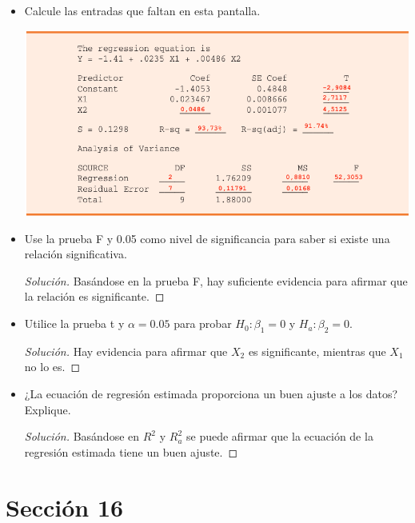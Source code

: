 \documentclass[a4paper,12pt]{article}
\newenvironment{solution}
  {\renewcommand\qedsymbol{$\blacksquare$}\begin{proof}[Solución]}
  {\end{proof}}
\begin{document}
\begin{itemize}
    \item Calcule las entradas que faltan en esta pantalla.
    \begin{center}
        \includegraphics[scale=0.5]{Imagenes/50-52.png}
    \end{center}
    \item  Use la prueba F y 0.05 como nivel de significancia para saber si existe una relación significativa.
    \begin{solution}
    Basándose en la prueba F, hay suficiente evidencia para afirmar que la relación es significante.
    \end{solution}
    \item  Utilice la prueba t y $\alpha= 0.05$ para probar $H_0: \beta_1=0$ y $H_a: \beta_2= 0$.
    \begin{solution}
    Hay evidencia para afirmar que $X_2$ es significante, mientras que $X_1$ no lo es.
    \end{solution}
   \item  ¿La ecuación de regresión estimada proporciona un buen ajuste a los datos? Explique.
   \begin{solution}
   Basándose en $R^2$ y $R^2_a$ se puede afirmar que la ecuación de la regresión estimada tiene un buen ajuste.
   \end{solution}
\end{itemize}


\section{Sección 16}
\end{document}
